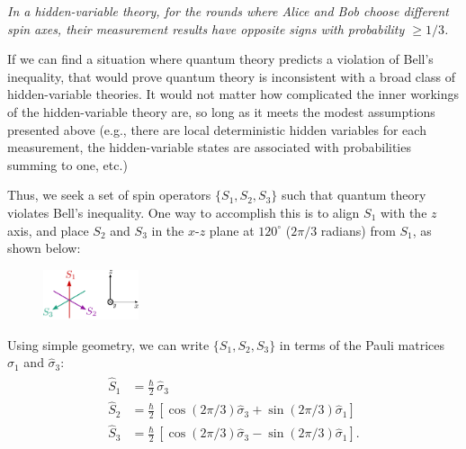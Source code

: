 \documentclass[pra,12pt]{revtex4-2}
\begin{document}
\begin{framed}
\noindent
\textit{In a hidden-variable theory, for the rounds where Alice and
  Bob choose different spin axes, their measurement results have
  opposite signs with probability $\ge 1/3$.}
\end{framed}

If we can find a situation where quantum theory predicts a violation
of Bell's inequality, that would prove quantum theory is inconsistent
with a broad class of hidden-variable theories.  It would not matter
how complicated the inner workings of the hidden-variable theory are,
so long as it meets the modest assumptions presented above (e.g.,
there are local deterministic hidden variables for each measurement,
the hidden-variable states are associated with probabilities summing
to one, etc.)

Thus, we seek a set of spin operators $\{S_1, S_2, S_3\}$ such that
quantum theory violates Bell's inequality.  One way to accomplish this
is to align $S_1$ with the $z$ axis, and place $S_2$ and $S_3$ in the
$x$-$z$ plane at $120^\circ$ ($2\pi/3$ radians) from $S_1$, as shown
below:

\begin{figure}[h]
  \centering\includegraphics[width=0.25\textwidth]{bellaxes}
\end{figure}

\noindent
Using simple geometry, we can write $\{S_1, S_2, S_3\}$ in terms of
the Pauli matrices $\hat{\sigma}_1$ and $\hat{\sigma}_3$:
\begin{align}
  \begin{aligned}\hat{S}_1 &= \frac{\hbar}{2} \, \hat{\sigma}_3
    \\ \hat{S}_2 &= \frac{\hbar}{2} \, \left[\cos(2\pi/3) \hat{\sigma}_3 + \sin(2\pi/3)\hat{\sigma}_1\right]  \\   \hat{S}_3 &= \frac{\hbar}{2} \, \left[\cos(2\pi/3) \hat{\sigma}_3 - \sin(2\pi/3)\hat{\sigma}_1\right].\end{aligned}
\end{align}
\end{document}
